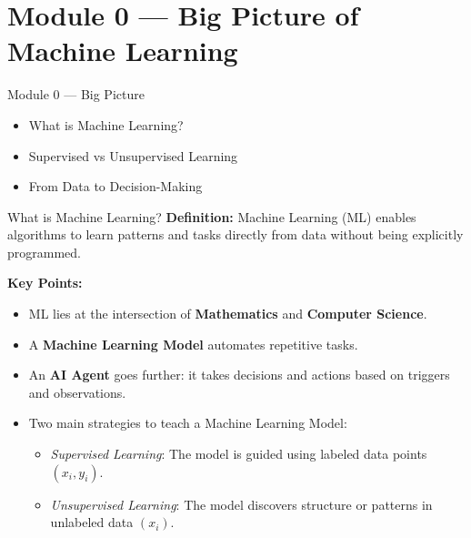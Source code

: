 \documentclass{beamer}
\begin{document}
\section{Module 0 — Big Picture of Machine Learning}

\begin{frame}{Module 0 — Big Picture}
\begin{itemize}
    \item What is Machine Learning?
    \item Supervised vs Unsupervised Learning
    \item From Data to Decision-Making
\end{itemize}
\end{frame}

\begin{frame}{What is Machine Learning?}
\textbf{Definition:} Machine Learning (ML) enables algorithms to learn patterns and tasks directly from data without being explicitly programmed.

\vspace{0.5cm}

\textbf{Key Points:}
\begin{itemize}
    \item ML lies at the intersection of \textbf{Mathematics} and \textbf{Computer Science}.
    \item A \textbf{Machine Learning Model} automates repetitive tasks.
    \item An \textbf{AI Agent} goes further: it takes decisions and actions based on triggers and observations.
    \item Two main strategies to teach a Machine Learning Model:
    \begin{itemize}
        \item \textit{Supervised Learning}: The model is guided using labeled data points $(x_i, y_i)$.
        \item \textit{Unsupervised Learning}: The model discovers structure or patterns in unlabeled data $(x_i)$.
    \end{itemize}
\end{itemize}

\end{frame}
\end{document}

